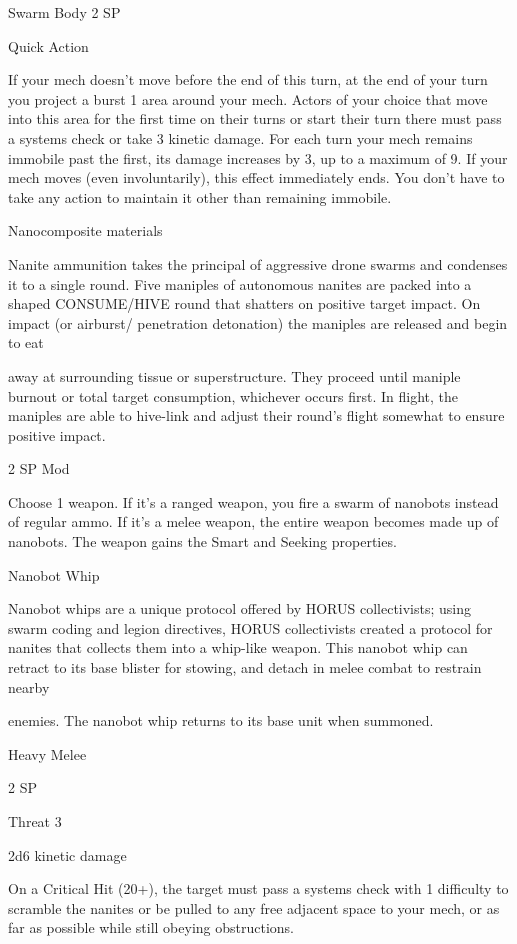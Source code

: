 Swarm Body
2 SP

Quick Action





If your mech doesn’t move before the end of this turn, at the end of your turn you project a burst
1 area around your mech. Actors of your choice that move into this area for the first time on their
turns or start their turn there must pass a systems check or take 3 kinetic damage. For each turn
your mech remains immobile past the first, its damage increases by 3, up to a maximum of 9. If
your mech moves (even involuntarily), this effect immediately ends. You don’t have to take any
action to maintain it other than remaining immobile.


Nanocomposite materials

Nanite ammunition takes the principal of aggressive drone swarms and condenses it to a single round. Five
maniples of autonomous nanites are packed into a shaped CONSUME/HIVE round that shatters on positive
target impact. On impact (or airburst/ penetration detonation) the maniples are released and begin to eat

away at surrounding tissue or superstructure. They proceed until maniple burnout or total target
consumption, whichever occurs first. In flight, the maniples are able to hive-link and adjust their round’s
flight somewhat to ensure positive impact.

2 SP
Mod

Choose 1 weapon. If it’s a ranged weapon, you fire a swarm of nanobots instead of regular
ammo. If it’s a melee weapon, the entire weapon becomes made up of nanobots. The weapon
gains the Smart and Seeking properties.


Nanobot Whip

Nanobot whips are a unique protocol offered by HORUS collectivists; using swarm coding and legion
directives, HORUS collectivists created a protocol for nanites that collects them into a whip-like weapon.
This nanobot whip can retract to its base blister for stowing, and detach in melee combat to restrain nearby

enemies. The nanobot whip returns to its base unit when summoned.

Heavy Melee

2 SP

Threat 3

2d6 kinetic damage

On a Critical Hit (20+), the target must pass a systems check with 1 difficulty to scramble the
nanites or be pulled to any free adjacent space to your mech, or as far as possible while still
obeying obstructions.


